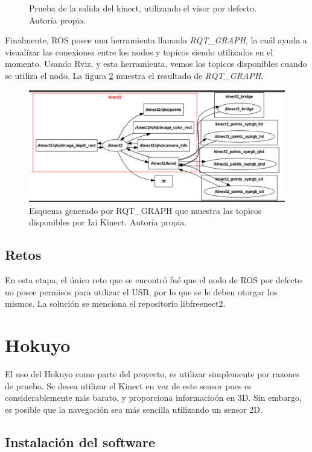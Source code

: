 \begin{figure}[H]
\caption{Prueba de la salida del kinect, utilizando el visor por defecto. Autoría propia.}
\label{F:kinect1}
\end{figure}

Finalmente, ROS posee una herramienta llamada \textit{RQT\_GRAPH}, la cuál ayuda a visualizar las conexiones entre los nodos y topicos siendo utilizados en el momento. Usando Rviz, y esta herramienta, vemos los topicos disponibles cuando se utiliza el nodo. La figura \ref{F:diagramakinect} muestra el resultado de \textit{RQT\_GRAPH}.

\begin{figure}[h!]
\centering
\includegraphics[scale=0.4]{imagenes/kinect_rqt_graph.png}
\caption{Esquema generado por RQT\_GRAPH que muestra las topicos disponibles por Iai Kinect. Autoría propia.}
\label{F:diagramakinect}
\end{figure}

\subsection{Retos}

En esta etapa, el único reto que se encontró fué que el nodo de ROS por defecto no posee permisos para utilizar el USB, por lo que se le deben otorgar los mismos. La solución se menciona el repositorio libfreenect2.

\section{Hokuyo}

El uso del Hokuyo como parte del proyecto, es utilizar simplemente por razones de prueba. Se desea utilizar el Kinect en vez de este sensor pues es considerablemente más barato, y proporciona informacioón en 3D. Sin embargo, es posible que la navegación sea más sencilla utilizando un sensor 2D.

\subsection{Instalación del software}

